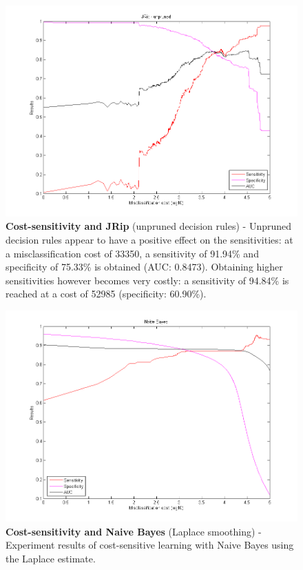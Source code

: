 \newpage
\begin{figure}[h]
\includegraphics[scale=0.65]{img/jrip-nopruning.png}
\caption{\textbf{Cost-sensitivity and JRip} (unpruned decision rules) - Unpruned decision rules appear to have a positive effect on the sensitivities: at a misclassification cost of 33350, a sensitivity of 91.94\% and specificity of 75.33\% is obtained (AUC: 0.8473). Obtaining higher sensitivities however  becomes very costly: a sensitivity of 94.84\% is reached at a cost of 52985 (specificity: 60.90\%).}
\end{figure}

\newpage
\begin{figure}[h]
\includegraphics[scale=0.65]{img/naivebayes.png}
\caption{\textbf{Cost-sensitivity and Naive Bayes} (Laplace smoothing) - Experiment results of cost-sensitive learning with Naive Bayes using the Laplace estimate.}
\end{figure}

